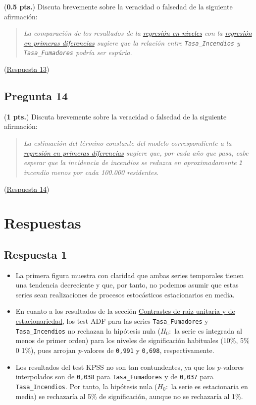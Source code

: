 \documentclass[10pt]{article}
\begin{document}
(\textbf{0.5 pts.}) Discuta brevemente sobre la veracidad o falsedad de la siguiente afirmación:
\begin{quote}
\emph{La comparación de los resultados de la \hyperref[sec:org1a45e1f]{regresión en niveles} con la \hyperref[sec:org229f929]{regresión en primeras diferencias} sugiere que la relación entre \texttt{Tasa\_Incendios} y \texttt{Tasa\_Fumadores} podría ser espúria}.
\end{quote}

(\hyperref[sec:org178a5b6]{Respuesta 13})
\subsection*{Pregunta 14}
\label{sec:org663bf1c}

(\textbf{1 pts.}) Discuta brevemente sobre la veracidad o falsedad de la siguiente afirmación:
\begin{quote}
\emph{La estimación del término constante del modelo correspondiente a la \hyperref[sec:org229f929]{regresión en primeras diferencias} sugiere que, por cada año que pasa, cabe esperar que la incidencia de incendios se reduzca en aproximadamente \texttt{1} incendio menos por cada 100.000 residentes}.
\end{quote}

(\hyperref[sec:org6c82b00]{Respuesta 14})
\section*{Respuestas}
\label{sec:org2a45e96}

\subsection*{Respuesta 1}
\label{sec:org1d836a2}

\begin{itemize}
\item La primera figura muestra con claridad que ambas series temporales tienen una tendencia decreciente y que, por tanto, no podemos asumir que estas series sean realizaciones de procesos estocásticos estacionarios en media.

\item En cuanto a los resultados de la sección \hyperref[sec:org3ac1b04]{Contrastes de raiz unitaria y de estacionariedad}, los test ADF para las series \texttt{Tasa\_Fumadores} y \texttt{Tasa\_Incendios} no rechazan la hipótesis nula (\(H_0:\) la serie es integrada al menos de primer orden) para los niveles de significación habituales (10\%, 5\% 0 1\%), pues arrojan \emph{p}-valores de \texttt{0,991} y \texttt{0,698}, respectivamente.

\item Los resultados del test KPSS no son tan contundentes, ya que los \emph{p}-valores interpolados son de \texttt{0,038} para \texttt{Tasa\_Fumadores} y de \texttt{0,037} para \texttt{Tasa\_Incendios}. Por tanto, la hipótesis nula (\(H_0:\) la serie es estacionaria en media) se rechazaría al 5\% de significación, aunque no se rechazaría al 1\%.
\end{itemize}
\end{document}
